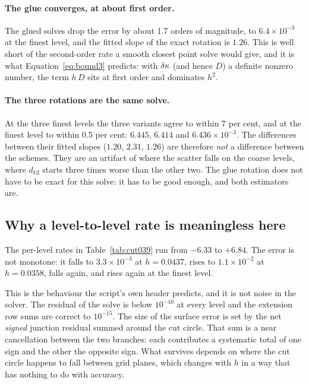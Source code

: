 \paragraph{The glue converges, at about first order.} The glued solves
drop the error by about 1.7 orders of magnitude, to
$6.4\times10^{-3}$ at the finest level, and the fitted slope of the
exact rotation is $1.26$. This is well short of the second-order rate a
smooth closest point solve would give, and it is what
Equation~\eqref{eq:bound3} predicts: with $\delta\kappa$ (and hence $D$) a
definite nonzero number, the term $h\,D$ sits at first order and
dominates $h^2$.

\paragraph{The three rotations are the same solve.} At the three finest
levels the three variants agree to within 7 per cent, and at the finest
level to within 0.5 per cent: $6.445$, $6.414$ and
$6.436 \times 10^{-3}$. The differences between their fitted slopes
($1.20$, $2.31$, $1.26$) are therefore \emph{not} a difference between
the schemes. They are an artifact of where the scatter falls on the
coarse levels, where $d_{k2}$ starts three times worse than the other
two. The glue rotation does not have to be exact for this solve: it has
to be good enough, and both estimators are.

\subsection{Why a level-to-level rate is meaningless here}
\label{sec:scatter}

The per-level rates in Table~\ref{tab:cut039} run from $-6.33$ to
$+6.84$. The error is not monotone: it falls to $3.3\times10^{-3}$ at
$h=0.0437$, rises to $1.1\times10^{-2}$ at $h=0.0358$, falls again, and
rises again at the finest level.

This is the behaviour the script's own header predicts, and it is not
noise in the solver. The residual of the solve is below $10^{-10}$ at
every level and the extension row sums are correct to $10^{-15}$. The
size of the surface error is set by the net \emph{signed} junction
residual summed around the cut circle. That sum is a near cancellation
between the two branches: each contributes a systematic total of one
sign and the other the opposite sign. What survives depends on where the
cut circle happens to fall between grid planes, which changes with $h$ in
a way that has nothing to do with accuracy.

